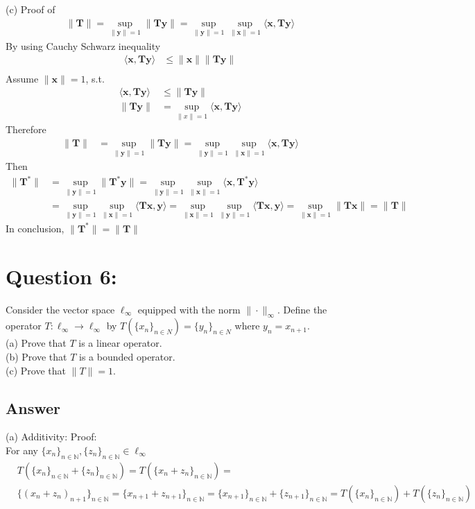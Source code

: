 \documentclass[a4paper,12pt]{article}
\newcommand{\N}{\mathbb{N}}
\begin{document}
\vspace{1cm}
\noindent
(c)
Proof of 
\begin{align*}
    \|\bm{T}\| = \sup_{\|\bm{y}\| = 1}\|\bm{T}\bm{y}\| = \sup_{\|\bm{y}\| = 1}\sup_{\|\bm{x}\| = 1}\langle \bm{x}, \bm{T}\bm{y} \rangle
\end{align*}
By using Cauchy Schwarz inequality
\begin{align*}
    \langle \bm{x}, \bm{T}\bm{y} \rangle &\leq \|\bm{x}\|\|\bm{T}\bm{y}\| \\
\end{align*}
Assume \(\|\bm{x}\| = 1\), s.t.
\begin{align*}
    \langle \bm{x}, \bm{T}\bm{y} \rangle &\leq \|\bm{T}\bm{y}\| \\
    \|\bm{T}\bm{y}\| &= \sup_{\|x\| = 1} \langle \bm{x}, \bm{T}\bm{y} \rangle
\end{align*}
Therefore
\begin{align*}
    \|\bm{T}\| &= \sup_{\|\bm{y}\| = 1}\|\bm{T}\bm{y}\| = \sup_{\|\bm{y}\| = 1}\sup_{\|\bm{x}\| = 1}\langle \bm{x}, \bm{T}\bm{y} \rangle
\end{align*}
Then
\begin{align*}
    \|\bm{T}^*\| &= \sup_{\|\bm{y}\|=1} \|\bm{T}^* \bm{y}\| = \sup_{\|\bm{y}\|=1}  \sup_{\|\bm{x}\|=1}\langle \bm{x}, \bm{T}^*\bm{y}\rangle \\
    &= \sup_{\|\bm{y}\| = 1} \sup_{ \|\bm{x}\| = 1} \langle \bm{T}\bm{x}, \bm{y} \rangle = \sup_{\|\bm{x}\| = 1} \sup_{ \|\bm{y}\| = 1} \langle \bm{T}\bm{x}, \bm{y} \rangle = \sup_{\|\bm{x}\|=1}\|\bm{T}\bm{x}\| = \|\bm{T}\|
\end{align*}
In conclusion, \(\|\bm{T}^*\| = \|\bm{T}\|\)

\section*{Question 6:}
Consider the vector space \(\ell_{\infty}\) equipped with the norm \(\|\cdot\|_{\infty}\). Define the operator \(T: \ell_{\infty} \to \ell_{\infty}\) by \(T(\{x_n\}_{n \in N}) = \{y_n\}_{n\in N}\) where \(y_n = x_{n+1}\). \\
(a) Prove that \(T\) is a linear operator. \\
(b) Prove that \(T\) is a bounded operator. \\
(c) Prove that \(\|T\|=1\).

\subsection*{Answer}
(a) Additivity: Proof: \\
For any \(\{x_n\}_{n \in \N} , \{z_n\}_{n \in \N} \in \ell_\infty\)
\begin{align*}
    &T(\{x_n\}_{n\in\N} + \{z_n\}_{n\in\N}) = T(\{x_n + z_n\}_{n\in\N}) = \\
    &\{(x_n + z_n)_{n+1}\}_{n\in\N} = \{x_{n+1} + z_{n+1}\}_{n\in\N} = \{x_{n+1}\}_{n\in\N} + \{z_{n+1}\}_{n\in\N} = T(\{x_n\}_{n\in\N}) + T(\{z_n\}_{n\in\N})
\end{align*}
\end{document}
